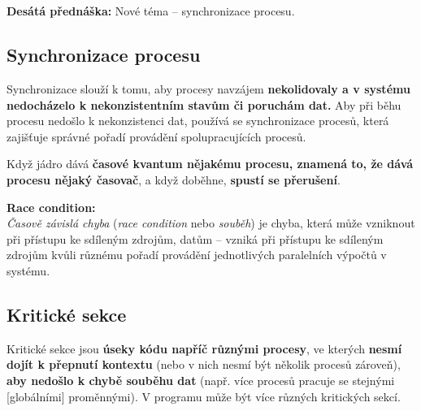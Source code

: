 \documentclass[a4paper, 11pt]{article}
\begin{document}
\newpage

\section{}
\textbf{Desátá přednáška:} Nové téma -- synchronizace procesu.

\subsection{Synchronizace procesu} \label{synchronizace-procesu}
Synchronizace slouží k tomu, aby procesy navzájem \textbf{nekolidovaly a v systému nedocházelo k nekonzistentním stavům či poruchám dat.} Aby při běhu procesu nedošlo k nekonzistenci dat, používá se synchronizace procesů, která zajišťuje správné pořadí provádění spolupracujících procesů.
 
Když jádro dává \textbf{časové kvantum nějakému procesu, znamená to, že dává procesu nějaký časovač}, a když doběhne, \textbf{spustí se přerušení}.
 
\textbf{Race condition:} \\
\emph{Časově závislá chyba} (\emph{race condition} nebo \emph{souběh}) je chyba, která může vzniknout při přístupu ke sdíleným zdrojům, datům -- vzniká při přístupu ke sdíleným zdrojům kvůli různému pořadí provádění jednotlivých paralelních výpočtů v systému.

\subsection{Kritické sekce}
Kritické sekce jsou \textbf{úseky kódu napříč různými procesy}, ve kterých \textbf{nesmí dojít k přepnutí kontextu} (nebo v nich nesmí být několik procesů zároveň), \textbf{aby nedošlo k chybě souběhu dat} (např. více procesů pracuje se stejnými [globálními] proměnnými). V programu může být více různých kritických sekcí.
 
\end{document}
